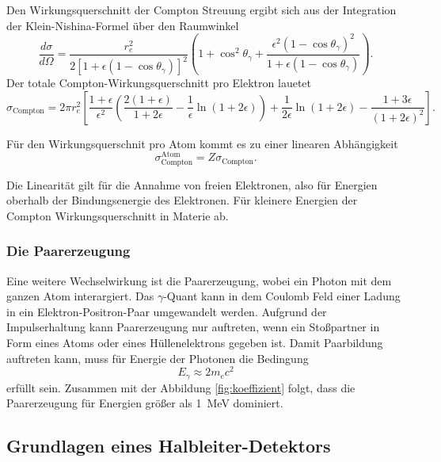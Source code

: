 Den Wirkungsquerschnitt der Compton Streuung ergibt sich aus der Integration der Klein-Nishina-Formel über den Raumwinkel
\begin{equation}
    \frac{d \sigma}{d \Omega}=\frac{r_e^2}{2\left[1+\epsilon\left(1-\cos \theta_\gamma\right)\right]^2}\left(1+\cos ^2 \theta_\gamma+\frac{\epsilon^2\left(1-\cos \theta_\gamma\right)^2}{1+\epsilon\left(1-\cos \theta_\gamma\right)}\right).
\end{equation}
Der totale Compton-Wirkungsquerschnitt pro Elektron lauetet
\begin{equation}
    \sigma_{\text{Compton}}=2 \pi r_e^2\left[\frac{1+\epsilon}{\epsilon^2}\left(\frac{2(1+\epsilon)}{1+2 \epsilon}-\frac{1}{\epsilon} \ln (1+2 \epsilon)\right)+\frac{1}{2 \epsilon} \ln (1+2 \epsilon)-\frac{1+3 \epsilon}{(1+2 \epsilon)^2}\right].
    \label{eqn:Compton_Wirkungsquerschnitt}
\end{equation}

Für den Wirkungsquerschnit pro Atom kommt es zu einer linearen Abhängigkeit
\begin{equation}
    \sigma_{\text{Compton}}^{\text{Atom}}=Z \sigma_{\text{Compton}}.
\end{equation}

Die Linearität gilt für die Annahme von freien Elektronen, also für Energien oberhalb der
Bindungsenergie des Elektronen.
Für kleinere Energien der Compton Wirkungsquerschnitt in Materie ab.

\subsubsection{Die Paarerzeugung}
\label{paarerzeugung}

Eine weitere Wechselwirkung ist die Paarerzeugung, wobei ein Photon mit dem ganzen Atom interargiert.
Das $\gamma$-Quant kann in dem Coulomb Feld einer Ladung in ein Elektron-Positron-Paar umgewandelt werden.
Aufgrund der Impulserhaltung kann Paarerzeugung nur auftreten, wenn ein Stoßpartner in Form eines Atoms oder eines Hüllenelektrons
gegeben ist.
Damit Paarbildung auftreten kann, muss für Energie der Photonen die Bedingung 
\begin{equation}
    E_\gamma \approx 2 m_e c^2
\end{equation}
erfüllt sein. 
Zusammen mit der Abbildung \ref{fig:koeffizient} folgt, dass die Paarerzeugung für Energien größer als \qty{1}{\mega\eV} dominiert.

\subsection{Grundlagen eines Halbleiter-Detektors}
\label{sec:Halbleiter-Detektor}

